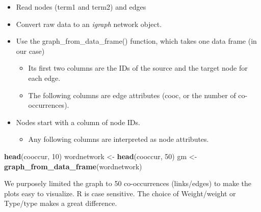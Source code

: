 \documentclass[
]{article}
\newenvironment{Shaded}{\begin{snugshade}}{\end{snugshade}}
\newcommand{\DecValTok}[1]{\textcolor[rgb]{0.00,0.00,0.81}{#1}}
\newcommand{\FunctionTok}[1]{\textcolor[rgb]{0.13,0.29,0.53}{\textbf{#1}}}
\newcommand{\NormalTok}[1]{#1}
\newcommand{\OtherTok}[1]{\textcolor[rgb]{0.56,0.35,0.01}{#1}}
\providecommand{\tightlist}{%
  \setlength{\itemsep}{0pt}\setlength{\parskip}{0pt}}
\begin{document}
\begin{itemize}
\tightlist
\item
  Read nodes (term1 and term2) and edges
\item
  Convert raw data to an \emph{igraph} network object.
\item
  Use the graph\_from\_data\_frame() function, which takes one data frame (in our case)

  \begin{itemize}
  \tightlist
  \item
    Its first two columns are the IDs of the source and the target node for each edge.
  \item
    The following columns are edge attributes (cooc, or the number of co-occurrences).
  \end{itemize}
\item
  Nodes start with a column of node IDs.

  \begin{itemize}
  \tightlist
  \item
    Any following columns are interpreted as node attributes.
  \end{itemize}
\end{itemize}

\footnotesize

\begin{Shaded}
\begin{Highlighting}[]
\FunctionTok{head}\NormalTok{(cooccur, }\DecValTok{10}\NormalTok{)}
\NormalTok{wordnetwork }\OtherTok{\textless{}{-}} \FunctionTok{head}\NormalTok{(cooccur, }\DecValTok{50}\NormalTok{)}
\NormalTok{gm }\OtherTok{\textless{}{-}} \FunctionTok{graph\_from\_data\_frame}\NormalTok{(wordnetwork)}
\end{Highlighting}
\end{Shaded}

\normalsize

We purposely limited the graph to 50 co-occurrences (links/edges) to make the plots easy to visualize. R is case sensitive. The choice of Weight/weight or Type/type makes a great difference.
\end{document}
